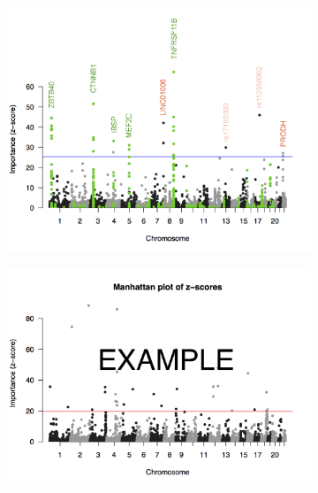 \documentclass[10pt,letterpaper]{article}
\begin{document}
\begin{figure}[tbhp]
  \begin{adjustwidth}{-2.00in}{0in}
    \caption{\textbf{Genome-wide importance of SNPs for bone mineral density association}}
    \label{figure:ranksumtest}
     \begin{subfigure}[b]{0.5\linewidth}
     \includegraphics[totalheight=7cm]{./figs/BMDTopWholeGenome_annotated.png}
      \label{figure:BMDTopWholeGenome} 
    \end{subfigure} 
 \begin{subfigure}[b]{0.5\linewidth}
      \centering
      \includegraphics[totalheight=7cm]{./figs/BMDTopWholeGenome_BW_random.png}
      \label{zoomplotTNFRSF} 

\end{subfigure}
\end{adjustwidth}
\end{figure}
\end{document}
